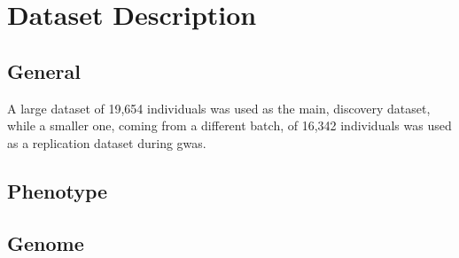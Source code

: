 \chapter{Dataset Description}\label{chap:dataset}
\section{General}
A large dataset of 19,654 individuals was used as the main, discovery dataset, while a smaller one, coming from a different batch, of 16,342 individuals was used as a replication dataset during \ac{gwas}.
\section{Phenotype}
\section{Genome}